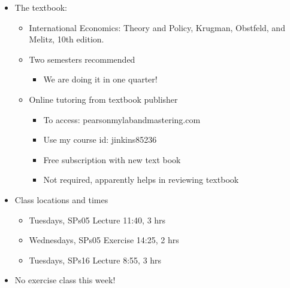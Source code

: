 \documentclass[ignorenonframetext,]{beamer}
\begin{document}
\begin{frame}

\begin{itemize}
\itemsep1pt\parskip0pt
\item
  The textbook:

  \begin{itemize}
  \itemsep1pt\parskip0pt
  \item
    International Economics: Theory and Policy, Krugman, Obstfeld, and
    Melitz, 10th edition.
  \item
    Two semesters recommended
    \begin{itemize}
        \item We are doing it in one quarter!
    \end{itemize}
  \item
    Online tutoring from textbook publisher 
    \begin{itemize}
        \item To access: pearsonmylabandmastering.com
        \item Use my course id:  jinkins85236
        \item Free subscription with new text book
        \item Not required, apparently helps in reviewing textbook 
    \end{itemize}
  \end{itemize}
\end{itemize}

\end{frame}

\begin{frame}

\begin{itemize}
\itemsep1pt\parskip0pt
\item
    Class locations and times

  \begin{itemize}
  \itemsep1pt\parskip0pt
  \item
    Tuesdays, SPs05 Lecture 11:40, 3 hrs
  \item
    Wednesdays, SPs05 Exercise 14:25, 2 hrs
  \item
    Tuesdays, SPs16 Lecture 8:55, 3 hrs
  \end{itemize}
  \item No exercise class this week!
\end{itemize}

\end{frame}
\end{document}
